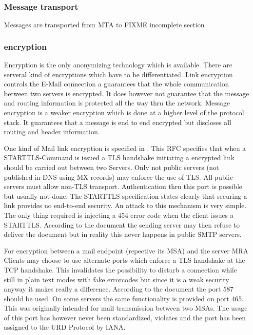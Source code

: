 \subsubsection{Message transport}
Messages are transported from MTA to \cite{RFC1870}
FIXME incomplete section

\subsubsection{encryption}
Encryption is the only anonymizing technology which is available. There are serveral kind of encryptions which have to be differentiated. Link encryption controls the E-Mail connection a guarantees that the whole communication between two servers is encrypted. It does however not guarantee that the message and routing information is protected all the way thru the network. Message encryption is a weaker encryption which is done at a higher level of the protocol stack. It guarantees that a message is end to end encrypted but discloses all routing and header information.\par

One kind of Mail link encryption is specified in \cite{RFC3207}. This RFC specifies that when a STARTTLS-Command is issued a TLS handshake initiating a encrypted link should be carried out between two Servers. Only not public servers (not published in DNS using MX records) may enforce the use of TLS. All public servers must allow non-TLS transport. Authentication thru this port is possible but usually not done. The STARTTLS specification states clearly that securing a link provides no end-to-end security. An attack to this mechanism is very simple. The only thing required is injecting a 454 error code when the client issues a STARTTLS. According to the document the sending server may then refuse to deliver the document but in reality this never happens in public SMTP servers.\par

For encryption between a mail endpoint (repective its MSA)  and the server MRA Clients may choose to use alternate ports which enforce a TLS handshake at the TCP handshake. This invalidates the possibility to disturb a connection while still in plain text modes with fake errorcodes but since it is a weak security anyway it makes really a difference. According to the \cite{RFC3207} document the port 587 should be used. On some servers the same functionality is provided on port 465. This was originally intended for mail transmission between two MSAs. The usage of this port has however never been standardized, violates \cite{RFC6409} and the port has been assigned to the URD Protocol by IANA.\par

